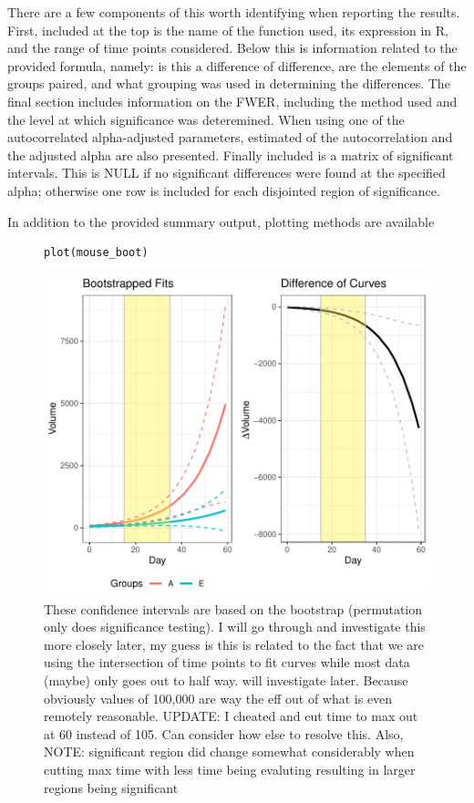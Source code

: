 \documentclass{article}
\begin{document}
There are a few components of this worth identifying when reporting the results. First, included at the top is the name of the function used, its expression in R, and the range of time points considered. Below this is information related to the provided formula, namely: is this a difference of difference, are the elements of the groups paired, and what grouping was used in determining the differences. The final section includes information on the FWER, including the method used and the level at which significance was deteremined. When using one of the autocorrelated alpha-adjusted parameters, estimated of the autocorrelation and the adjusted alpha are also presented. Finally included is a matrix of significant intervals. This is NULL if no significant differences were found at the specified alpha; otherwise one row is included for each disjointed region of significance. 

In addition to the provided summary output, plotting methods are available

\begin{figure}[H]
\centering
\begin{BVerbatim}
plot(mouse_boot)
\end{BVerbatim}

\includegraphics{img/mouse_boot_plot.pdf}
\caption{These confidence intervals are based on the bootstrap (permutation only does significance testing). I will go through and investigate this more closely later, my guess is this is related to the fact that we are using the intersection of time points to fit curves while most data (maybe) only goes out to half way. will investigate later. Because obviously values of 100,000 are way the eff out of what is even remotely reasonable. UPDATE: I cheated and cut time to max out at 60 instead of 105. Can consider how else to resolve this. Also, NOTE: significant region did change somewhat considerably when cutting max time with less time being evaluting resulting in larger regions being significant}
\end{figure}
\end{document}
